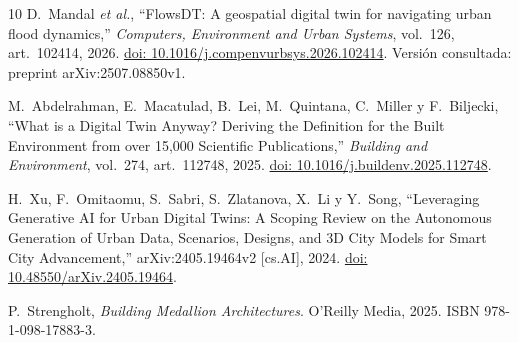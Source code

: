 \documentclass[journal]{IEEEtran}
\begin{document}
\begin{thebibliography}{10}
D.~Mandal \emph{et al.}, ``FlowsDT: A geospatial digital twin for navigating urban flood dynamics,'' \emph{Computers, Environment and Urban Systems}, vol.~126, art.~102414, 2026. \href{https://doi.org/10.1016/j.compenvurbsys.2026.102414}{doi: 10.1016/j.compenvurbsys.2026.102414}. Versión consultada: preprint arXiv:2507.08850v1.

M.~Abdelrahman, E.~Macatulad, B.~Lei, M.~Quintana, C.~Miller y F.~Biljecki, ``What is a Digital Twin Anyway? Deriving the Definition for the Built Environment from over 15,000 Scientific Publications,'' \emph{Building and Environment}, vol.~274, art.~112748, 2025. \href{https://doi.org/10.1016/j.buildenv.2025.112748}{doi: 10.1016/j.buildenv.2025.112748}.

H.~Xu, F.~Omitaomu, S.~Sabri, S.~Zlatanova, X.~Li y Y.~Song, ``Leveraging Generative AI for Urban Digital Twins: A Scoping Review on the Autonomous Generation of Urban Data, Scenarios, Designs, and 3D City Models for Smart City Advancement,'' arXiv:2405.19464v2 [cs.AI], 2024. \href{https://doi.org/10.48550/arXiv.2405.19464}{doi: 10.48550/arXiv.2405.19464}.

P.~Strengholt, \emph{Building Medallion Architectures}. O'Reilly Media, 2025. ISBN 978-1-098-17883-3.

\end{thebibliography}
\end{document}
